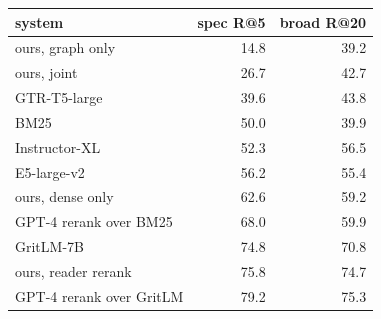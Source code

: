 \begin{tabular}{lrr}
\toprule
system & spec R@5 & broad R@20 \\
\midrule
ours, graph only & 14.8 & 39.2 \\
ours, joint & 26.7 & 42.7 \\
GTR-T5-large & 39.6 & 43.8 \\
BM25 & 50.0 & 39.9 \\
Instructor-XL & 52.3 & 56.5 \\
E5-large-v2 & 56.2 & 55.4 \\
ours, dense only & 62.6 & 59.2 \\
GPT-4 rerank over BM25 & 68.0 & 59.9 \\
GritLM-7B & 74.8 & 70.8 \\
ours, reader rerank & 75.8 & 74.7 \\
GPT-4 rerank over GritLM & 79.2 & 75.3 \\
\bottomrule
\end{tabular}
